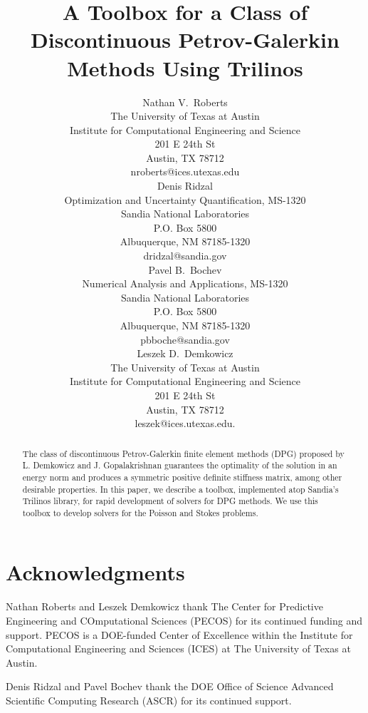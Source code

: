 \documentclass[pdf,12pt,article,relaxed]{SANDreport}
\title{A Toolbox for a Class of Discontinuous Petrov-Galerkin Methods Using Trilinos}
\author{Nathan V.\ Roberts\\
            The University of Texas at Austin\\
            Institute for Computational Engineering and Science\\
            201 E 24th St\\
            Austin, TX 78712\\
            nroberts@ices.utexas.edu\\[0.2in]
            Denis Ridzal\\Optimization and Uncertainty Quantification, MS-1320\\
            Sandia National Laboratories\\
            P.O. Box 5800 \\
            Albuquerque, NM 87185-1320\\
            dridzal@sandia.gov\\[0.2in]
            Pavel B.\ Bochev\\
            Numerical Analysis and Applications, MS-1320\\
            Sandia National Laboratories\\ P.O. Box 5800\\
            Albuquerque, NM 87185-1320\\
            pbboche@sandia.gov\\[0.2in]
            Leszek D.\ Demkowicz\\
            The University of Texas at Austin\\
            Institute for Computational Engineering and Science\\
            201 E 24th St\\
            Austin, TX 78712\\
            leszek@ices.utexas.edu.
           }		%
\date{}		%
\begin{document}

    \maketitle

%
\begin{abstract}
The class of discontinuous Petrov-Galerkin finite element methods (DPG) proposed by L. Demkowicz and J. Gopalakrishnan \cite{DPG1,DPG2} guarantees the optimality of the solution in an energy norm and produces a symmetric positive definite stiffness matrix, among other desirable properties.  In this paper, we describe a toolbox, implemented atop Sandia's Trilinos library, for rapid development of solvers for DPG methods.  We use this toolbox to develop solvers for the Poisson and Stokes problems.
\end{abstract}

    \clearpage
    \section*{Acknowledgments}
    Nathan Roberts and Leszek Demkowicz thank The Center for Predictive Engineering and COmputational Sciences (PECOS) for its continued funding and support.
    PECOS is a DOE-funded Center of Excellence within the Institute for Computational Engineering and Sciences (ICES) at The University of Texas at Austin.

    \noindent
    Denis Ridzal and Pavel Bochev thank the DOE Office of Science Advanced Scientific Computing Research (ASCR) for its continued support.
    
    \cleardoublepage		%
    \tableofcontents


    
\end{document}
